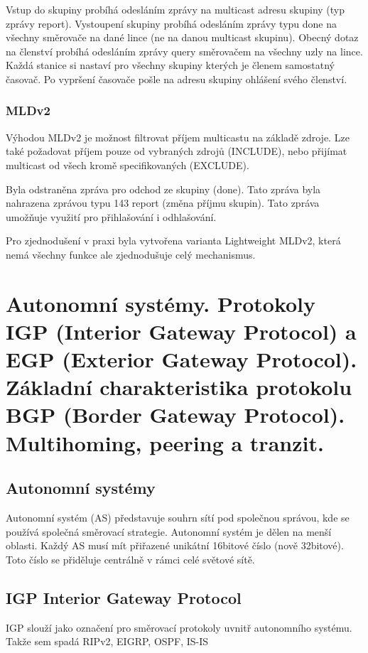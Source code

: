Vstup do skupiny probíhá odesláním zprávy na multicast adresu skupiny (typ zprávy report).
Vystoupení skupiny probíhá odesláním zprávy typu done na všechny směrovače na dané lince (ne na danou multicast skupinu).
Obecný dotaz na členství probíhá odesláním zprávy query směrovačem na všechny uzly na lince.
Každá stanice si nastaví pro všechny skupiny kterých je členem samostatný časovač.
Po vypršení časovače pošle na adresu skupiny ohlášení svého členství.

\subsubsection{MLDv2}

Výhodou MLDv2 je možnost filtrovat příjem multicastu na základě zdroje.
Lze také požadovat příjem pouze od vybraných zdrojů (INCLUDE), nebo přijímat multicast od všech kromě specifikovaných (EXCLUDE).

Byla odstraněna zpráva pro odchod ze skupiny (done).
Tato zpráva byla nahrazena zprávou typu 143 report (změna příjmu skupin).
Tato zpráva umožňuje využití pro přihlašování i odhlašování.

Pro zjednodušení v praxi byla vytvořena varianta Lightweight MLDv2, která nemá všechny funkce ale zjednodušuje celý mechanismus.


\clearpage
\section{Autonomní systémy. Protokoly IGP (Interior Gateway Protocol) a EGP (Exterior Gateway Protocol). Základní charakteristika protokolu BGP (Border Gateway Protocol). Multihoming, peering a tranzit.}

\subsection{Autonomní systémy}

Autonomní systém (AS) představuje souhrn sítí pod společnou správou, kde se používá společná směrovací strategie.
Autonomní systém je dělen na menší oblasti.
Každý AS musí mít přiřazené unikátní 16bitové číslo (nově 32bitové).
Toto číslo se přiděluje centrálně v rámci celé světové sítě.

\subsection{IGP Interior Gateway Protocol}

IGP slouží jako označení pro směrovací protokoly uvnitř autonomního systému.
Takže sem spadá RIPv2, EIGRP, OSPF, IS-IS

